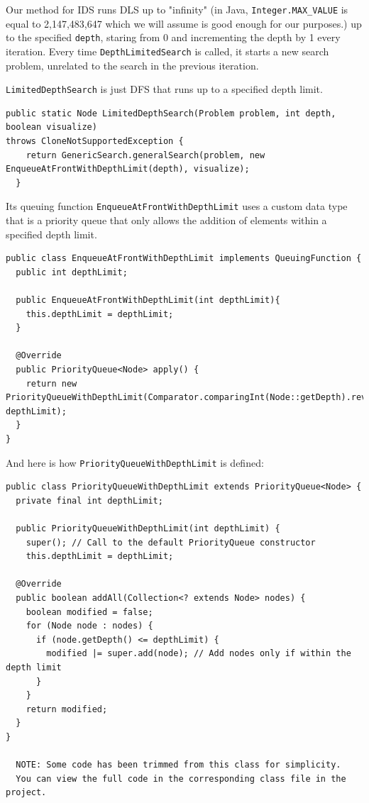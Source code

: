 \documentclass{article}
\begin{document}
Our method for IDS runs DLS up to "infinity" (in Java, \texttt{Integer.MAX\_VALUE} is equal to 2,147,483,647 which we will assume is good enough for our purposes.) up to the specified \texttt{depth}, staring from 0 and incrementing the depth by 1 every iteration. Every time \texttt{DepthLimitedSearch} is called, it starts a new search problem, unrelated to the search in the previous iteration. 

\newpage

\texttt{LimitedDepthSearch} is just DFS that runs up to a specified depth limit. 

\begin{verbatim}
public static Node LimitedDepthSearch(Problem problem, int depth, boolean visualize) 
throws CloneNotSupportedException {
    return GenericSearch.generalSearch(problem, new EnqueueAtFrontWithDepthLimit(depth), visualize);
  }
\end{verbatim}

Its queuing function \texttt{EnqueueAtFrontWithDepthLimit} uses a custom data type that is a priority queue that only allows the addition of elements within a specified depth limit.


\begin{verbatim}
public class EnqueueAtFrontWithDepthLimit implements QueuingFunction {
  public int depthLimit;

  public EnqueueAtFrontWithDepthLimit(int depthLimit){
    this.depthLimit = depthLimit;
  }

  @Override
  public PriorityQueue<Node> apply() {
    return new PriorityQueueWithDepthLimit(Comparator.comparingInt(Node::getDepth).reversed(), depthLimit);
  }
}

\end{verbatim}

And here is how \texttt{PriorityQueueWithDepthLimit} is defined:

\begin{verbatim}
public class PriorityQueueWithDepthLimit extends PriorityQueue<Node> {
  private final int depthLimit;

  public PriorityQueueWithDepthLimit(int depthLimit) {
    super(); // Call to the default PriorityQueue constructor
    this.depthLimit = depthLimit;

  @Override
  public boolean addAll(Collection<? extends Node> nodes) {
    boolean modified = false;
    for (Node node : nodes) {
      if (node.getDepth() <= depthLimit) {
        modified |= super.add(node); // Add nodes only if within the depth limit
      }
    }
    return modified;
  }
}

  NOTE: Some code has been trimmed from this class for simplicity. 
  You can view the full code in the corresponding class file in the project.
\end{verbatim}
\end{document}

